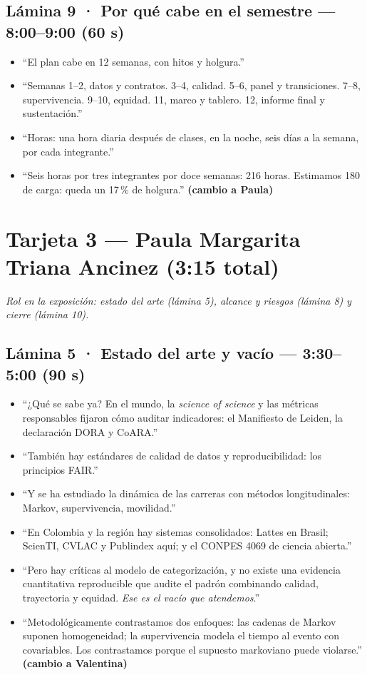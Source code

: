 \documentclass[10pt,a4paper]{article}
\newcommand{\tiempo}[1]{\textbf{\color{accent}#1}}
\begin{document}
\subsection{Lámina 9 · Por qué cabe en el semestre — 8:00--9:00 (60 s)}
\begin{itemize}
  \item ``El plan cabe en 12 semanas, con hitos y holgura.''
  \item ``Semanas 1--2, datos y contratos. 3--4, calidad. 5--6, panel y
        transiciones. 7--8, supervivencia. 9--10, equidad. 11, marco y tablero.
        12, informe final y sustentación.''
  \item ``Horas: una hora diaria después de clases, en la noche, seis días a la
        semana, por cada integrante.''
  \item ``Seis horas por tres integrantes por doce semanas: 216 horas.
        Estimamos 180 de carga: queda un 17\,\% de holgura.'' \hfill
        \tiempo{(cambio a Paula)}
\end{itemize}

\newpage
\section{Tarjeta 3 — Paula Margarita Triana Ancinez \quad (3:15 total)}

\textit{Rol en la exposición: estado del arte (lámina 5), alcance y riesgos
(lámina 8) y cierre (lámina 10).}

\subsection{Lámina 5 · Estado del arte y vacío — 3:30--5:00 (90 s)}
\begin{itemize}
  \item ``¿Qué se sabe ya? En el mundo, la \emph{science of science} y las
        métricas responsables fijaron cómo auditar indicadores: el Manifiesto
        de Leiden, la declaración DORA y CoARA.''
  \item ``También hay estándares de calidad de datos y reproducibilidad: los
        principios FAIR.''
  \item ``Y se ha estudiado la dinámica de las carreras con métodos
        longitudinales: Markov, supervivencia, movilidad.''
  \item ``En Colombia y la región hay sistemas consolidados: Lattes en Brasil;
        ScienTI, CVLAC y Publindex aquí; y el CONPES 4069 de ciencia abierta.''
  \item ``Pero hay críticas al modelo de categorización, y no existe una
        evidencia cuantitativa reproducible que audite el padrón combinando
        calidad, trayectoria y equidad. \emph{Ese es el vacío que atendemos}.''
  \item ``Metodológicamente contrastamos dos enfoques: las cadenas de Markov
        suponen homogeneidad; la supervivencia modela el tiempo al evento con
        covariables. Los contrastamos porque el supuesto markoviano puede
        violarse.'' \hfill \tiempo{(cambio a Valentina)}
\end{itemize}
\end{document}
